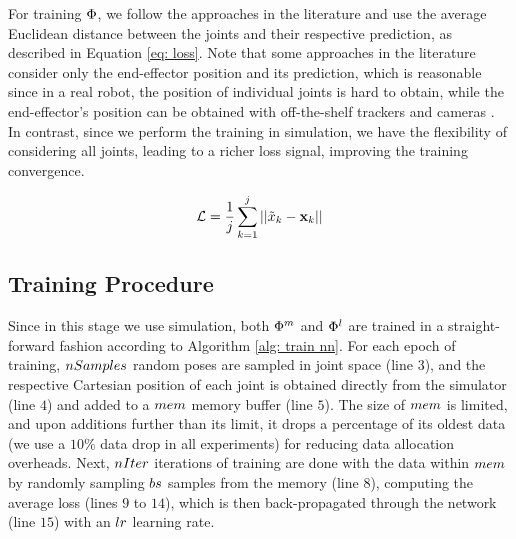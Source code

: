 For training $\nn$, we follow the approaches in the literature \cite{theofanidis2018kinematic,kesaba2022transfer,kesaba2022forward,dalla2020autonomous,sharkawy2022forward,sharkawy2023forward,loutfi2020learning,kanneganti2021developing,cursi2022augmented,bouzid2024exploring} and use the average Euclidean distance between the joints and their respective prediction, as described in Equation \ref{eq: loss}.
%
Note that some approaches in the literature consider only the end-effector position and its prediction, which is reasonable since in a real robot, the position of individual joints is hard to obtain, while the end-effector's position can be obtained with off-the-shelf trackers and cameras \cite{dalla2020autonomous}.
%
In contrast, since we perform the training in simulation, we have the flexibility of considering all joints, leading to a richer loss signal, improving the training convergence.

\begin{equation}\label{eq: loss}
	\mathcal{L} = \frac{1}{j}\sum_{k=1}^{j}||\tilde{x}_k-\mathrm{\mathbf{x}}_k||
\end{equation}

\subsection{Training Procedure}\label{subsec: training procedure}

Since in this stage we use simulation, both $\Phi^{m}$ and $\Phi^{l}$ are trained in a straight-forward 
fashion according to Algorithm \ref{alg: train nn}.
%
For each epoch of training, $nSamples$ random poses are sampled in joint space (line $3$), and the respective Cartesian position of each joint is obtained directly from the simulator (line $4$) and added to a $mem$ memory buffer (line $5$).
%
The size of $mem$ is limited, and upon additions further than its limit, it drops a percentage of its oldest data (we use a $10\%$ data drop in all experiments) for reducing data allocation overheads.
%
Next, $nIter$ iterations of training are done with the data within $mem$ by randomly sampling $bs$ samples from the memory (line $8$), computing the average loss (lines $9$ to $14$), which is then back-propagated through the network (line $15$) with an $lr$ learning rate.
 
\begin{algorithm}
	\caption{Training procedure for $\nn$.}\label{alg: train nn}
\end{algorithm}


